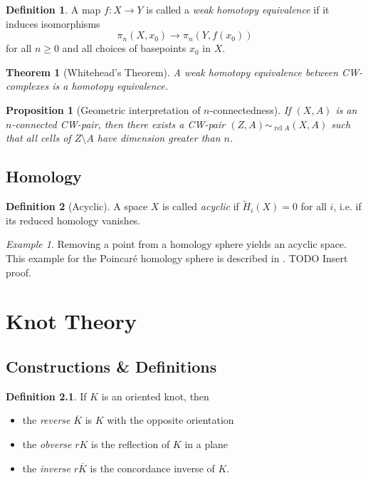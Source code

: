 \documentclass[nobib]{tufte-book} %
\newtheorem{theorem}{Theorem}
\newtheorem{proposition}{Proposition}
\theoremstyle{definition}
\newtheorem{definition}{Definition}
\theoremstyle{remark}
\newtheorem{example}{Example}
\DeclareMathOperator{\rel}{rel}
\begin{document}
\begin{definition}
	A map $f \colon X \rightarrow Y$ is called a
	\textit{weak homotopy equivalence} 
	if it induces isomorphisms
	\[
	\pi_n(X, x_0) \rightarrow \pi_n(Y, f(x_0))
	\]
	for all $n \ge 0$ and all choices of basepoints $x_0$ in $X$.
\end{definition}

\begin{theorem}[Whitehead's Theorem]
	A weak homotopy equivalence between CW-complexes is a homotopy equivalence.
\end{theorem}

\begin{proposition}[Geometric interpretation of $n$-connectedness]
	If $(X, A)$ is an $n$-connected CW-pair, then there exists
	a CW-pair $(Z, A) \sim_{\rel A} (X, A)$
	such that all cells of $Z \setminus A$ have dimension greater than $n$.
\end{proposition}

\section{Homology}

\begin{definition}[Acyclic]
	A space $X$ is called \textit{acyclic} if $\widetilde{H}_{i}(X) = 0$ for all $i$,
	i.e. if its reduced homology vanishes.
\end{definition}

\begin{example}
	Removing a point from a homology sphere yields an acyclic space.
	This example for the Poincar\'e homology sphere is described in
	\citep[Example 2.38]{hatcher2002algebraic}.
	TODO Insert proof. %
\end{example}


\chapter{Knot Theory}

\section{Constructions \& Definitions}




\begin{definition}
	If $K$ is an oriented knot, then
	\begin{itemize}
		\item the \textit{reverse} $\overline{K}$
		is $K$ with the opposite orientation
		
		\item the \textit{obverse} $rK$ is
		the reflection of $K$ in a plane
		
		\item the \textit{inverse} $r \overline{K}$
		is the concordance inverse of $K$.
	\end{itemize}
\end{definition}
\end{document}
